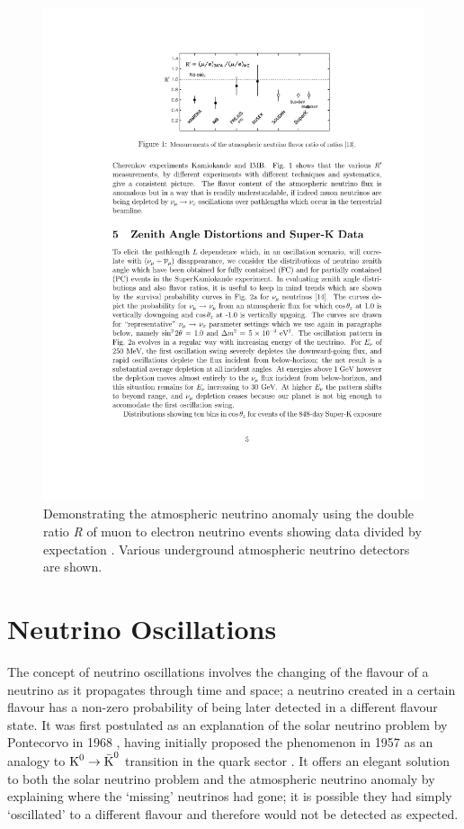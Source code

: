 \begin{figure}
  \centering
  \includegraphics[width=12cm]{AtmosphericNeutrinoAnomaly.pdf}
  \caption[Demonstrating the atmospheric neutrino anomaly using the double ratio \textit{R} of muon to electron neutrino events showing data divided by expectation.]{Demonstrating the atmospheric neutrino anomaly using the double ratio \textit{R} of muon to electron neutrino events showing data divided by expectation \cite{Mann1999}.  Various underground atmospheric neutrino detectors are shown.}
  \label{fig:AtmosphericNeutrinoAnomaly}
\end{figure}

\section{Neutrino Oscillations}\label{sec:NeutrinoOscillations}

The concept of neutrino oscillations involves the changing of the flavour of a neutrino as it propagates through time and space; a neutrino created in a certain flavour has a non-zero probability of being later detected in a different flavour state.  It was first postulated as an explanation of the solar neutrino problem by Pontecorvo in 1968 \cite{Pontecorvo1968,Pontecorvo1969}, having initially proposed the phenomenon in 1957 as an analogy to $\textnormal{K}^0 \rightarrow \bar{\textnormal{K}}^0$ transition in the quark sector \cite{Pontecorvo1957}.  It offers an elegant solution to both the solar neutrino problem and the atmospheric neutrino anomaly by explaining where the `missing' neutrinos had gone; it is possible they had simply `oscillated' to a different flavour and therefore would not be detected as expected.

